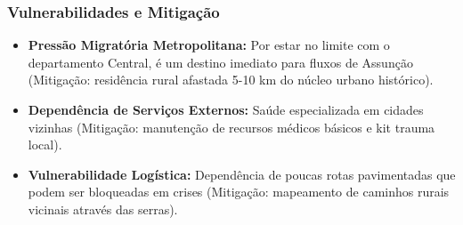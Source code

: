 \subsubsection{Vulnerabilidades e
Mitigação}

\begin{itemize}
\tightlist
\item
  \textbf{Pressão Migratória Metropolitana:} Por estar no limite com o
  departamento Central, é um destino imediato para fluxos de Assunção
  (Mitigação: residência rural afastada 5-10 km do núcleo urbano
  histórico).
\item
  \textbf{Dependência de Serviços Externos:} Saúde especializada em
  cidades vizinhas (Mitigação: manutenção de recursos médicos básicos e
  kit trauma local).
\item
  \textbf{Vulnerabilidade Logística:} Dependência de poucas rotas
  pavimentadas que podem ser bloqueadas em crises (Mitigação: mapeamento
  de caminhos rurais vicinais através das serras).
\end{itemize}

